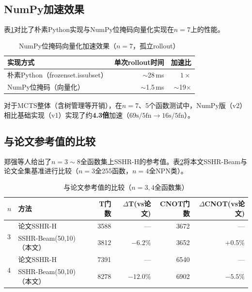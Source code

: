 \documentclass[10.5pt,compsoc,UTF8]{CjC}
\theoremstyle{mystyle}
\begin{document}
\subsection{\heiti NumPy加速效果}

表\ref{tab:numpy-speedup}对比了朴素Python实现与NumPy位掩码向量化实现在$n=7$上的性能。

\begin{table}[H]
  \centering
  \caption{NumPy位掩码向量化加速效果（$n=7$，孤立rollout）}
  \label{tab:numpy-speedup}
  \setlength{\tabcolsep}{8pt}
  \begin{tabular}{lrr}
    \toprule
    实现方式 & 单次rollout时间 & 加速比 \\
    \midrule
    朴素Python（frozenset.issubset）& $\sim$28\,ms & $1\times$ \\
    NumPy位掩码（向量化）& $\sim$1.5\,ms & $\sim$19$\times$ \\
    \bottomrule
  \end{tabular}
\end{table}

对于MCTS整体（含树管理等开销），在$n=7$、5个函数测试中，NumPy版（v2）相比基础实现（v1）实现了约\textbf{4.3倍}加速（$69\text{s}/5\text{fn} \to 16\text{s}/5\text{fn}$）。

\subsection{\heiti 与论文参考值的比较}

郑强等人\cite{zheng2025cnot}给出了$n=3\sim8$全函数集上SSHR-H的参考值。表\ref{tab:paper-ref}将本文SSHR-Beam与论文全集基准进行比较（$n=3$全255函数，$n=4$全NPN类）。

\begin{table}[H]
  \centering
  \caption{与论文\cite{zheng2025cnot}参考值的比较（$n=3,4$全函数集）}
  \label{tab:paper-ref}
  \setlength{\tabcolsep}{5pt}
  \begin{tabular}{llrrrr}
    \toprule
    $n$ & 方法 & T门数 & $\Delta$T(vs论文) & CNOT门数 & $\Delta$CNOT(vs论文) \\
    \midrule
    \multirow{2}{*}{3}
      & 论文SSHR-H\cite{zheng2025cnot} & 3588 & --- & 3672 & --- \\
      & SSHR-Beam(50,10)（本文）& 3812 & $-6.2\%$ & 3652 & +0.5\% \\
    \midrule
    \multirow{2}{*}{4}
      & 论文SSHR-H\cite{zheng2025cnot} & 7391 & --- & 6540 & --- \\
      & SSHR-Beam(50,10)（本文）& 8278 & $-12.0\%$ & 6902 & $-5.5\%$ \\
    \bottomrule
  \end{tabular}
\end{table}
\end{document}
